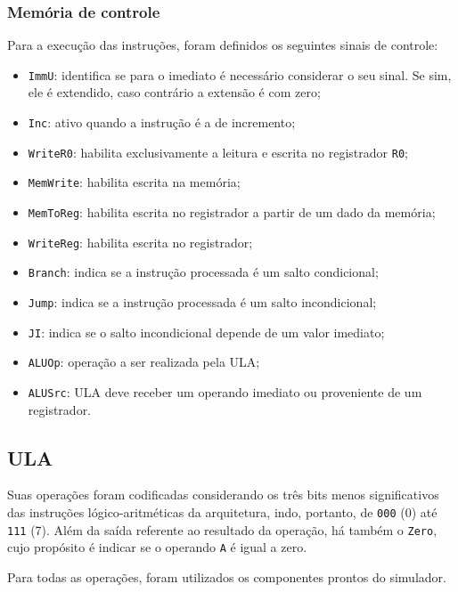 \documentclass[twocolumn, 11pt]{article}
\begin{document}
\subsubsection{Memória de controle}

Para a execução das instruções, foram definidos os seguintes sinais de controle:

\begin{itemize}
    \item \texttt{ImmU}: identifica se para o imediato é necessário considerar o seu sinal. Se sim, ele é extendido, caso contrário a extensão é com zero;
    \item \texttt{Inc}: ativo quando a instrução é a de incremento;
    \item \texttt{WriteR0}: habilita exclusivamente a leitura e escrita no registrador \texttt{R0};
    \item \texttt{MemWrite}: habilita escrita na memória;
    \item \texttt{MemToReg}: habilita escrita no registrador a partir de um dado da memória;
    \item \texttt{WriteReg}: habilita escrita no registrador; 
    \item \texttt{Branch}: indica se a instrução processada é um salto condicional;
    \item \texttt{Jump}: indica se a instrução processada é um salto incondicional;
    \item \texttt{JI}: indica se o salto incondicional depende de um valor imediato;
    \item \texttt{ALUOp}: operação a ser realizada pela ULA; 
    \item \texttt{ALUSrc}: ULA deve receber um operando imediato ou proveniente de um registrador.
\end{itemize}

\subsection{ULA}

Suas operações foram codificadas considerando os três bits menos significativos das instruções lógico-aritméticas da arquitetura, indo, portanto, de \texttt{000} (0) até \texttt{111} (7). Além da saída referente ao resultado da operação, há também o \texttt{Zero}, cujo propósito é indicar se o operando \texttt{A} é igual a zero.

Para todas as operações, foram utilizados os componentes prontos do simulador.
\end{document}
